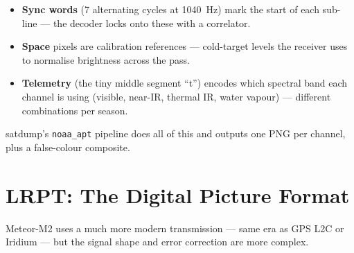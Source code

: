 \documentclass[11pt,a4paper]{article}
\begin{document}
\begin{center}
\end{center}

\begin{itemize}
  \item \textbf{Sync words} (7 alternating cycles at \SI{1040}{Hz})
        mark the start of each sub-line — the decoder locks onto these
        with a correlator.
  \item \textbf{Space} pixels are calibration references — cold-target
        levels the receiver uses to normalise brightness across the pass.
  \item \textbf{Telemetry} (the tiny middle segment ``t'') encodes
        which spectral band each channel is using (visible, near-IR,
        thermal IR, water vapour) — different combinations per season.
\end{itemize}

satdump's \texttt{noaa\_apt} pipeline does all of this and outputs
one PNG per channel, plus a false-colour composite.

\section{LRPT: The Digital Picture Format}

Meteor-M2 uses a much more modern transmission — same era as GPS L2C
or Iridium — but the signal shape and error correction are more
complex.
\end{document}

